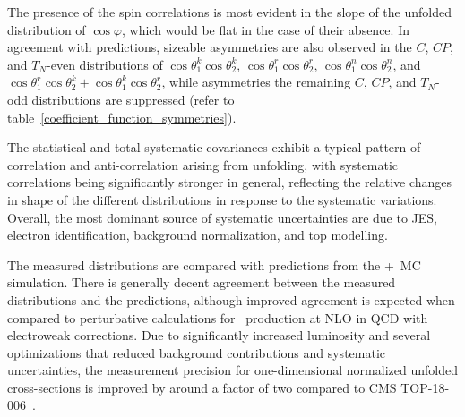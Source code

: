 \begin{refsection}
The presence of the spin correlations is most evident in the slope of the unfolded distribution of $\cos\varphi$, which would be flat in the case of their absence.
In agreement with predictions, sizeable asymmetries are also observed in the $C$, $CP$, and $T_N$-even distributions of $\cos\theta_{1}^{k}\cos\theta_{2}^{k}$, $\cos\theta_{1}^{r}\cos\theta_{2}^{r}$, $\cos\theta_{1}^{n}\cos\theta_{2}^{n}$, and $\cos\theta_{1}^{r}\cos\theta_{2}^{k}+\cos\theta_{1}^{k}\cos\theta_{2}^{r}$, while asymmetries the remaining $C$, $CP$, and $T_N$-odd distributions are suppressed (refer to table~\ref{coefficient_function_symmetries}).

The statistical and total systematic covariances exhibit a typical pattern of correlation and anti-correlation arising from unfolding, with systematic correlations being significantly stronger in general, reflecting the relative changes in shape of the different distributions in response to the systematic variations.
Overall, the most dominant source of systematic uncertainties are due to JES, electron identification, background normalization, and top \pT modelling.

The measured distributions are compared with predictions from the \Powheg+\Pythia\ MC simulation.
There is generally decent agreement between the measured distributions and the predictions, although improved agreement is expected when compared to perturbative calculations for \ttbar\ production at NLO in QCD with electroweak corrections.
Due to significantly increased luminosity and several optimizations that reduced background contributions and systematic uncertainties, the measurement precision for one-dimensional normalized unfolded cross-sections is improved by around a factor of two compared to CMS TOP-18-006~\cite{Sirunyan:2681777}.


\end{refsection}
